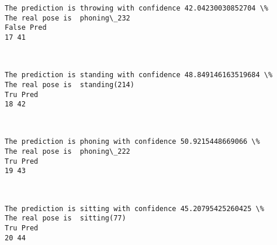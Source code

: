 \documentclass[11pt]{article}
\begin{document}
    \begin{Verbatim}[commandchars=\\\{\}]
The prediction is throwing with confidence 42.04230030852704 \%
The real pose is  phoning\_232
False Pred
17 41

    \end{Verbatim}

    \begin{center}
    \end{center}
    { \hspace*{\fill} \\}
    
    \begin{Verbatim}[commandchars=\\\{\}]
The prediction is standing with confidence 48.849146163519684 \%
The real pose is  standing(214)
Tru Pred
18 42

    \end{Verbatim}

    \begin{center}
    \end{center}
    { \hspace*{\fill} \\}
    
    \begin{Verbatim}[commandchars=\\\{\}]
The prediction is phoning with confidence 50.9215448669066 \%
The real pose is  phoning\_222
Tru Pred
19 43

    \end{Verbatim}

    \begin{center}
    \end{center}
    { \hspace*{\fill} \\}
    
    \begin{Verbatim}[commandchars=\\\{\}]
The prediction is sitting with confidence 45.20795425260425 \%
The real pose is  sitting(77)
Tru Pred
20 44

    \end{Verbatim}

    \begin{center}
    \end{center}
    { \hspace*{\fill} \\}
    
\end{document}
